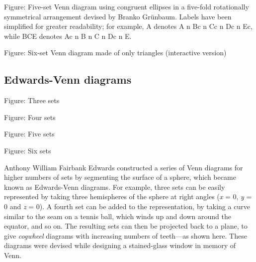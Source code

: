 


Figure: Five-set Venn diagram using congruent ellipses in a five-fold rotationally
symmetrical arrangement devised by Branko Grünbaum. Labels have been simplified for
greater readability; for example, A denotes A n Bc n Cc n Dc n Ec, while BCE denotes Ac n
B n C n Dc n E.






Figure: Six-set Venn diagram made of only triangles (interactive version)




\subsection{Edwards-Venn diagrams}
\label{sss:edwa-260e}







Figure: Three sets






Figure: Four sets






Figure: Five sets






Figure: Six sets



Anthony William Fairbank Edwards constructed a series of Venn diagrams for higher numbers
of sets by segmenting the surface of a sphere, which became known as Edwards-Venn
diagrams. For example, three sets can be easily represented by taking three hemispheres of
the sphere at right angles (\textit{x} = 0, \textit{y} = 0 and \textit{z} = 0). A fourth
set can be added to the representation, by taking a curve similar to the seam on a tennis
ball, which winds up and down around the equator, and so on. The resulting sets can then
be projected back to a plane, to give \textit{cogwheel} diagrams with increasing numbers
of teeth—as shown here. These diagrams were devised while designing a stained-glass window
in memory of Venn.





